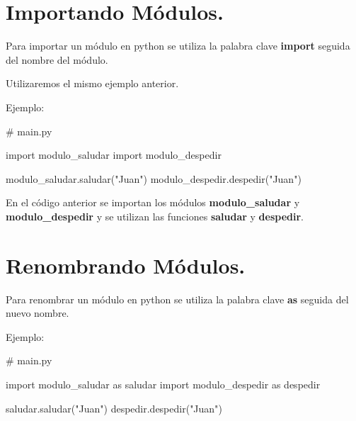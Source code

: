 \documentclass[
  a4paper,
  DIV=11,
  numbers=noendperiod,
  onepage,
  openany]{scrreprt}
\newenvironment{Shaded}{\begin{snugshade}}{\end{snugshade}}
\newcommand{\CommentTok}[1]{\textcolor[rgb]{0.37,0.37,0.37}{#1}}
\newcommand{\ImportTok}[1]{\textcolor[rgb]{0.00,0.46,0.62}{#1}}
\newcommand{\NormalTok}[1]{\textcolor[rgb]{0.00,0.23,0.31}{#1}}
\newcommand{\StringTok}[1]{\textcolor[rgb]{0.13,0.47,0.30}{#1}}
\begin{document}
\section{Importando Módulos.}\label{importando-muxf3dulos.}

Para importar un módulo en python se utiliza la palabra clave
\textbf{import} seguida del nombre del módulo.

\begin{tcolorbox}[enhanced jigsaw, bottomrule=.15mm, rightrule=.15mm, colframe=quarto-callout-tip-color-frame, arc=.35mm, breakable, colbacktitle=quarto-callout-tip-color!10!white, toptitle=1mm, colback=white, opacitybacktitle=0.6, opacityback=0, bottomtitle=1mm, toprule=.15mm, titlerule=0mm, left=2mm, coltitle=black, leftrule=.75mm, title=\textcolor{quarto-callout-tip-color}{\faLightbulb}\hspace{0.5em}{Tip}]

Utilizaremos el mismo ejemplo anterior.

\end{tcolorbox}

Ejemplo:

\begin{Shaded}
\begin{Highlighting}[]
\CommentTok{\# main.py}

\ImportTok{import}\NormalTok{ modulo\_saludar}
\ImportTok{import}\NormalTok{ modulo\_despedir}

\NormalTok{modulo\_saludar.saludar(}\StringTok{"Juan"}\NormalTok{)}
\NormalTok{modulo\_despedir.despedir(}\StringTok{"Juan"}\NormalTok{)}
\end{Highlighting}
\end{Shaded}

En el código anterior se importan los módulos \textbf{modulo\_saludar} y
\textbf{modulo\_despedir} y se utilizan las funciones \textbf{saludar} y
\textbf{despedir}.

\section{Renombrando Módulos.}\label{renombrando-muxf3dulos.}

Para renombrar un módulo en python se utiliza la palabra clave
\textbf{as} seguida del nuevo nombre.

Ejemplo:

\begin{Shaded}
\begin{Highlighting}[]
\CommentTok{\# main.py}

\ImportTok{import}\NormalTok{ modulo\_saludar }\ImportTok{as}\NormalTok{ saludar}
\ImportTok{import}\NormalTok{ modulo\_despedir }\ImportTok{as}\NormalTok{ despedir}

\NormalTok{saludar.saludar(}\StringTok{"Juan"}\NormalTok{)}
\NormalTok{despedir.despedir(}\StringTok{"Juan"}\NormalTok{)}
\end{Highlighting}
\end{Shaded}
\end{document}
